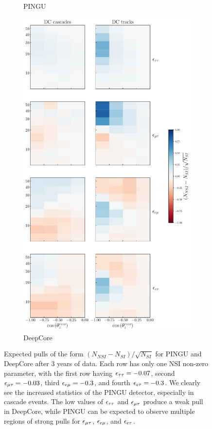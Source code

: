 {{\begin{figure}[t]
\begin{center}
\begin{subfigure}{0.44\textwidth}
         \caption{PINGU}\label{fig:PINGU_event_pulls}
      \end{subfigure}
      \begin{subfigure}{0.54\textwidth}
         \includegraphics[width=1\linewidth]{figures/DC_event_pulls.pdf}
         \caption{DeepCore}\label{fig:DC_event_pulls}
      \end{subfigure}
    \end{center}
   \caption{Expected pulls of the form $(N_{NSI} - N_{SI})/\sqrt{N_{SI}}$ for PINGU and DeepCore after 3 years of data. 
   Each row has only one NSI non-zero parameter, with the first row having $\epsilon_{\tau\tau}= -0.07$, second $\epsilon_{\mu\tau} = -0.03$, third $\epsilon_{e\mu} = -0.3$, and fourth $\epsilon_{e\tau} = -0.3$.
   We clearly see the increased statistics of the PINGU detector, especially in cascade events. The low values of $\epsilon_{\tau\tau}$ and $\epsilon_{\mu\tau}$ produce a weak pull in DeepCore,
   while PINGU can be expected to observe multiple regions of strong pulls for $\epsilon_{\mu\tau}$, $\epsilon_{e\mu}$, and $\epsilon_{e\tau}$.}\label{fig:event_pulls}
\end{figure}

}}
